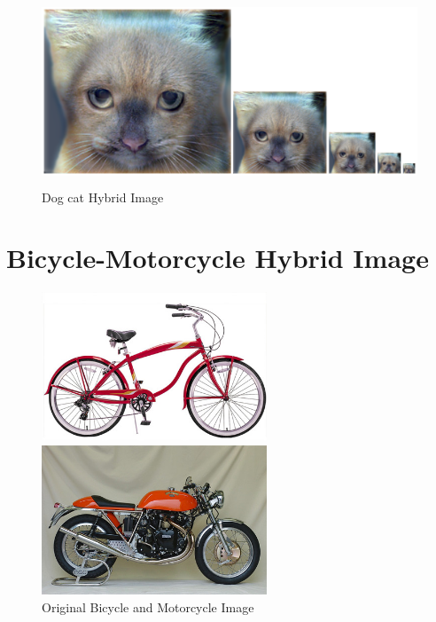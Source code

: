 \documentclass[12pt]{report}
\begin{document}
\begin{figure}[H]
	\centering
		\includegraphics[height=15em]{./images/dog_cat_hybrid.png}
		\caption{Dog cat Hybrid Image}
		\label{dog_cat_low_hybrid}
\end{figure}
\section{Bicycle-Motorcycle Hybrid Image}
\vspace{1.25em}
\begin{figure}[H]
    \centering
    \begin{minipage}{0.45\textwidth}
            \centering
            \includegraphics[height=12em]{./images/bicycle.jpg}
        \end{minipage}
        \begin{minipage}{0.45\textwidth}
            \centering
            \includegraphics[height=12em]{./images/motorcycle.jpg}
        \end{minipage}
        \caption{Original Bicycle and Motorcycle Image}
        \label{bicycle_motorcycle}
\end{figure}
\end{document}
